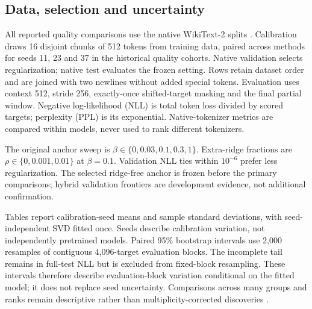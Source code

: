 \documentclass[conference]{IEEEtran}
\begin{document}
\subsection{Data, selection and uncertainty}
All reported quality comparisons use the native WikiText-2 splits \cite{merity2016wikitext}. Calibration draws 16 disjoint chunks of 512 tokens from training data, paired across methods for seeds 11, 23 and 37 in the historical quality cohorts. Native validation selects regularization; native test evaluates the frozen setting. Rows retain dataset order and are joined with two newlines without added special tokens. Evaluation uses context 512, stride 256, exactly-once shifted-target masking and the final partial window. Negative log-likelihood (NLL) is total token loss divided by scored targets; perplexity (PPL) is its exponential. Native-tokenizer metrics are compared within models, never used to rank different tokenizers.\par\smallskip
The original anchor sweep is $\beta\in\{0,0.03,0.1,0.3,1\}$. Extra-ridge fractions are $\rho\in\{0,0.001,0.01\}$ at $\beta=0.1$. Validation NLL ties within $10^{-6}$ prefer less regularization. The selected ridge-free anchor is frozen before the primary comparisons; hybrid validation frontiers are development evidence, not additional confirmation.\par\smallskip
Tables report calibration-seed means and sample standard deviations, with seed-independent SVD fitted once. Seeds describe calibration variation, not independently pretrained models. Paired 95\% bootstrap intervals use 2,000 resamples of contiguous 4,096-target evaluation blocks. The incomplete tail remains in full-test NLL but is excluded from fixed-block resampling. These intervals therefore describe evaluation-block variation conditional on the fitted model; it does not replace seed uncertainty. Comparisons across many groups and ranks remain descriptive rather than multiplicity-corrected discoveries \cite{biderman2024evaluation}.\par\smallskip
\end{document}
